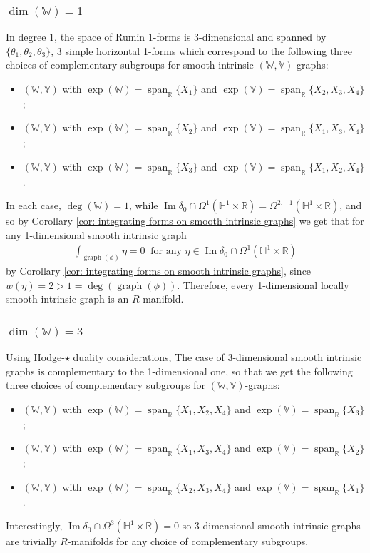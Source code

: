 \documentclass[dvipsnames]{amsart}
\theoremstyle{definition}
\theoremstyle{definition}
\numberwithin{equation}{section}
\newcommand{\W}{\mathbb{W}}
\newcommand{\V}{\mathbb{V}}
\newcommand{\R}{\mathbb{R}}
\renewcommand{\H}{\mathbb{H}}
\begin{document}
\subsubsection*{$\operatorname{dim}(\W)=1$} In degree 1, the space of Rumin 1-forms is 3-dimensional and spanned by $\{\theta_1,\theta_2,\theta_3\}$, 3 simple horizontal 1-forms which correspond to the following three choices of complementary subgroups for smooth intrinsic $(\W,\V)$-graphs:
\begin{itemize}
    \item $(\W,\V)$ with $\exp(\W)=\operatorname{span}_\R\{X_1\}$ and $\exp(\V)=\operatorname{span}_\R\{X_2,X_3,X_4\}$;
    \item $(\W,\V)$ with $\exp(\W)=\operatorname{span}_\R\{X_2\}$ and $\exp(\V)=\operatorname{span}_\R\{X_1,X_3,X_4\}$;
    \item $(\W,\V)$ with $\exp(\W)=\operatorname{span}_\R\{X_3\}$ and $\exp(\V)=\operatorname{span}_\R\{X_1,X_2,X_4\}$.
\end{itemize}
In each case, $\operatorname{deg}(\W)=1$, while $\operatorname{Im}\delta_0\cap\Omega^1(\H^1\times\R)=\Omega^{2,-1}(\H^1\times\R)$, and so by Corollary \ref{cor: integrating forms on smooth intrinsic graphs} we get that for any 1-dimensional smooth intrinsic graph  
\begin{align*}
    \int_{\operatorname{graph}(\phi)}\eta=0\ \text{ for any }\eta\in\operatorname{Im}\delta_0\cap\Omega^1(\H^1\times\R)
\end{align*}
by Corollary \ref{cor: integrating forms on smooth intrinsic graphs}, since $w(\eta)=2>1=\operatorname{deg}(\operatorname{graph}(\phi))$.
Therefore, every 1-dimensional locally smooth intrinsic graph is an $R$-manifold.
\subsubsection*{$\operatorname{dim}(\W)=3$} Using Hodge-$\star$ duality considerations, The case of 3-dimensional smooth intrinsic graphs is complementary to the 1-dimensional one, so that we get the following three choices of complementary subgroups for $(\W,\V)$-graphs:
\begin{itemize}
    \item $(\W,\V)$ with $\exp(\W)=\operatorname{span}_\R\{X_1,X_2,X_4\}$ and $\exp(\V)=\operatorname{span}_\R\{X_3\}$;
    \item $(\W,\V)$ with $\exp(\W)=\operatorname{span}_\R\{X_1,X_3,X_4\}$ and $\exp(\V)=\operatorname{span}_\R\{X_2\}$;
    \item $(\W,\V)$ with $\exp(\W)=\operatorname{span}_\R\{X_2,X_3,X_4\}$ and $\exp(\V)=\operatorname{span}_\R\{X_1\}$.
\end{itemize}
Interestingly, $\operatorname{Im}\delta_0\cap\Omega^3(\H^1\times\R)=0$ so 3-dimensional smooth intrinsic graphs are trivially $R$-manifolds for any choice of complementary subgroups.
\end{document}
